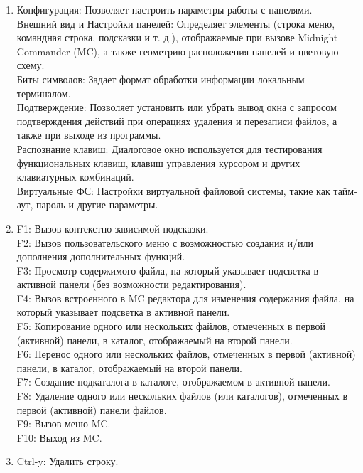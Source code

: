 \documentclass[
  english,
  russian,
  12pt,
  a4paper,
  DIV=11,
  numbers=noendperiod]{scrreprt}
\begin{document}
\begin{enumerate}
  пользователя, вызываемое по клавише F2.\\
  Редактировать файл расцветки имён: Позволяет настроить цветовую схему
  для имен файлов в зависимости от их типа.
\item
  Конфигурация: Позволяет настроить параметры работы с панелями.\\
  Внешний вид и Настройки панелей: Определяет элементы (строка меню,
  командная строка, подсказки и т. д.), отображаемые при вызове Midnight
  Commander (MC), а также геометрию расположения панелей и цветовую
  схему.\\
  Биты символов: Задает формат обработки информации локальным
  терминалом.\\
  Подтверждение: Позволяет установить или убрать вывод окна с запросом
  подтверждения действий при операциях удаления и перезаписи файлов, а
  также при выходе из программы.\\
  Распознание клавиш: Диалоговое окно используется для тестирования
  функциональных клавиш, клавиш управления курсором и других
  клавиатурных комбинаций.\\
  Виртуальные ФС: Настройки виртуальной файловой системы, такие как
  тайм-аут, пароль и другие параметры.
\item
  F1: Вызов контекстно-зависимой подсказки.\\
  F2: Вызов пользовательского меню с возможностью создания и/или
  дополнения дополнительных функций.\\
  F3: Просмотр содержимого файла, на который указывает подсветка в
  активной панели (без возможности редактирования).\\
  F4: Вызов встроенного в MC редактора для изменения содержания файла,
  на который указывает подсветка в активной панели.\\
  F5: Копирование одного или нескольких файлов, отмеченных в первой
  (активной) панели, в каталог, отображаемый на второй панели.\\
  F6: Перенос одного или нескольких файлов, отмеченных в первой
  (активной) панели, в каталог, отображаемый на второй панели.\\
  F7: Создание подкаталога в каталоге, отображаемом в активной панели.\\
  F8: Удаление одного или нескольких файлов (или каталогов), отмеченных
  в первой (активной) панели файлов.\\
  F9: Вызов меню MC.\\
  F10: Выход из MC.
\item
  Ctrl-y: Удалить строку.\\

\end{enumerate}
\end{document}
